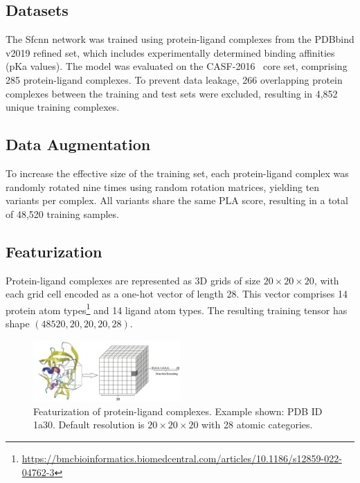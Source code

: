 \documentclass[unnumsec,webpdf,contemporary,large]{oup-authoring-template}
\theoremstyle{thmstyleone}%
\theoremstyle{thmstyletwo}%
\theoremstyle{thmstylethree}%
\begin{document}
\subsection{Datasets}
\vspace{0.5em}
The Sfcnn network was trained using protein-ligand complexes from the PDBbind v2019 refined set, which includes experimentally determined binding affinities (pKa values). The model was evaluated on the CASF-2016~\cite{su2018comparative} core set, comprising 285 protein-ligand complexes. To prevent data leakage, 266 overlapping protein complexes between the training and test sets were excluded, resulting in 4,852 unique training complexes.

\subsection{Data Augmentation}
\vspace{0.5em}
To increase the effective size of the training set, each protein-ligand complex was randomly rotated nine times using random rotation matrices, yielding ten variants per complex. All variants share the same PLA score, resulting in a total of 48,520 training samples.

\subsection{Featurization}
\vspace{0.5em}
Protein-ligand complexes are represented as 3D grids of size $20 \times 20 \times 20$, with each grid cell encoded as a one-hot vector of length 28. This vector comprises 14 protein atom types\footnote{\url{https://bmcbioinformatics.biomedcentral.com/articles/10.1186/s12859-022-04762-3}} and 14 ligand atom types. The resulting training tensor has shape $(48520, 20, 20, 20, 28)$.

\begin{figure}[H]
    \centering
    \includegraphics[width=0.5\textwidth]{images/one_hot.png}
    \caption{Featurization of protein-ligand complexes. Example shown: PDB ID 1a30. Default resolution is $20\times20\times20$ with 28 atomic categories.}
    \label{fig:onehot}
\end{figure}
\end{document}
